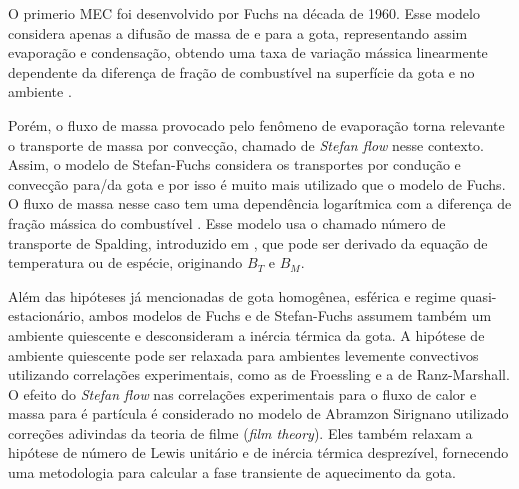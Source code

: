 
O primerio MEC foi desenvolvido por Fuchs \cite{Fuchs1959} na década de 1960. 
Esse modelo considera apenas a difusão de massa de e para a gota, representando assim evaporação e condensação, obtendo uma taxa de variação mássica linearmente dependente da diferença de fração de combustível na superfície da gota e no ambiente \cite{Glassman2008}.

Porém, o fluxo de massa provocado pelo fenômeno de evaporação torna relevante o transporte de massa por convecção, chamado de \emph{Stefan flow} nesse contexto. 
Assim, o modelo de Stefan-Fuchs considera os transportes por condução e convecção para/da gota e por isso é muito mais utilizado que o modelo de Fuchs.
O fluxo de massa nesse caso tem uma dependência logarítmica com a diferença de fração mássica do combustível \cite{Glassman2008, Turns2000}.
Esse modelo usa o chamado número de transporte de Spalding, introduzido em \cite{Law1978}, que pode ser derivado da equação de temperatura ou de espécie, originando $B_T$ e $B_M$.

Além das hipóteses já mencionadas de gota homogênea, esférica e regime quasi-estacionário, ambos modelos de Fuchs e de Stefan-Fuchs assumem também um ambiente quiescente e desconsideram a inércia térmica da gota.
A hipótese de ambiente quiescente pode ser relaxada para ambientes levemente convectivos utilizando correlações experimentais, como as de Froessling e a de Ranz-Marshall. 
O efeito do \emph{Stefan flow} nas correlações experimentais para o fluxo de calor e massa para é partícula é considerado no modelo de Abramzon Sirignano \cite{Sirignano1989} utilizado correções adivindas da teoria de filme (\emph{film theory}).
Eles também relaxam a hipótese de número de Lewis unitário e de inércia térmica desprezível, fornecendo uma metodologia para calcular a fase transiente de aquecimento da gota.




